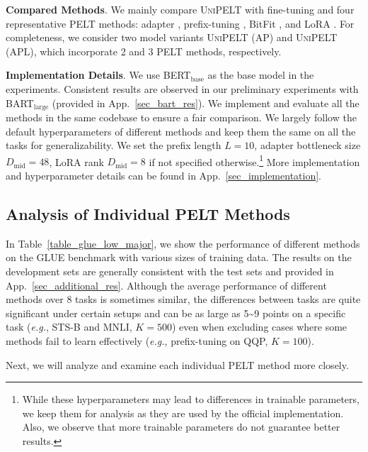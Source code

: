 {{\bf Compared Methods}.} We mainly compare \textsc{UniPELT} with fine-tuning and four representative PELT methods: adapter \cite{houlsby2019parameter}, prefix-tuning \cite{li-liang-2021-prefix}, BitFit \cite{ben2021bitfit}, and LoRA \cite{hu2021lora}. For completeness, we consider two model variants \textsc{UniPELT} (AP) and \textsc{UniPELT} (APL), which incorporate 2 and 3 PELT methods, respectively.

{{\bf Implementation Details}.} We use BERT$_\text{base}$ \cite{devlin-etal-2019-bert} as the base model in the experiments. Consistent results are observed in our preliminary experiments with BART$_\text{large}$ \cite{lewis-etal-2020-bart} (provided in App.~\ref{sec_bart_res}).
We implement and evaluate all the methods in the same codebase to ensure a fair comparison. We largely follow the default hyperparameters of different methods and keep them the same on all the tasks for generalizability. We set the prefix length $L=10$, adapter bottleneck size $D_{\text{mid}}=48$, LoRA rank $D_{\text{mid}}=8$ if not specified otherwise.\footnote{While these hyperparameters may lead to differences in trainable parameters, we keep them for analysis as they are used by the official implementation. Also, we observe that more trainable parameters do not guarantee better results.} More implementation and hyperparameter details can be found in App.~\ref{sec_implementation}.

\subsection{Analysis of Individual PELT Methods}
\label{sec_exp_existing}
In Table~\ref{table_glue_low_major}, we show the performance of different methods on the GLUE benchmark with various sizes of training data. The results on the development sets are generally consistent with the test sets and provided in App.~\ref{sec_additional_res}.
Although the average performance of different methods over 8 tasks is sometimes similar, the differences between tasks are quite significant under certain setups and can be as large as 5\textasciitilde9 points on a specific task (\textit{e.g.}, STS-B and MNLI, $K=500$) even when excluding cases where some methods fail to learn effectively (\textit{e.g.}, prefix-tuning on QQP, $K=100$).

Next, we will analyze and examine each individual PELT method more closely.

